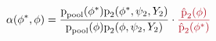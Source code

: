 \begin{equation*}
  \alpha (\phi^{*}, \phi) = 
  \frac {
    \pd_{\text{pool}} (\phi^{*})
    \pd_{2}(\phi^{*}, \psi_{2}, Y_{2})
  } {
    \pd_{\text{pool}} (\phi)
    \pd_{2}(\phi, \psi_{2}, Y_{2})
  }
  \cdot
  \textcolor{myredhighlight}{
    \frac {
      \hat{\pd}_{2}(\phi)
    } {
      \hat{\pd}_{2}(\phi^{*})
    }
  }
\end{equation*}